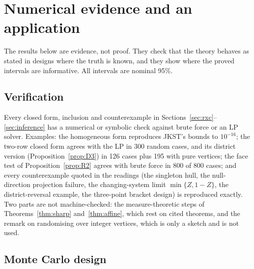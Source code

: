 \section{Numerical evidence and an application}\label{sec:evidence}

The results below are evidence, not proof. They check that the theory behaves as
stated in designs where the truth is known, and they show where the proved
intervals are informative. All intervals are nominal 95\%.

\subsection{Verification}

Every closed form, inclusion and counterexample in Sections~\ref{sec:rxc}--\ref{sec:inference}
has a numerical or symbolic check against brute force or an LP solver. Examples:
the homogeneous form reproduces JKST's bounds to $10^{-16}$; the two-row closed
form agrees with the LP in 300 random cases, and its district version
(Proposition~\ref{prop:D3}) in 126 cases plus 195 with pure vertices; the face test
of Proposition~\ref{prop:R2} agrees with brute force in 800 of 800 cases; and every
counterexample quoted in the readings (the singleton hull, the null-direction
projection failure, the changing-system limit $\min\{Z,1-Z\}$, the
district-reversal example, the three-point bracket design) is reproduced exactly.
Two parts are not machine-checked: the measure-theoretic steps of
Theorems~\ref{thm:sharp} and~\ref{thm:affine}, which rest on cited theorems, and the
remark on randomising over integer vertices, which is only a sketch and is not used.

\subsection{Monte Carlo design}

